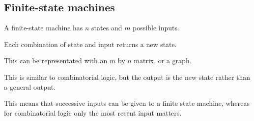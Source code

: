 
\subsection{Finite-state machines}

A finite-state machine has \(n\) states and \(m\) possible inputs.

Each combination of state and input returns a new state.

This can be representated with an \(m\) by \(n\) matrix, or a graph.

This is similar to combinatorial logic, but the output is the new state rather than a general output.

This means that successive inputs can be given to a finite state machine, whereas for combinatorial logic only the most recent input matters.


